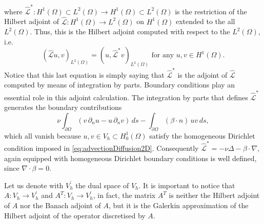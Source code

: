 \documentclass[hidelinks,onefignum,onetabnum]{siamart220329}
\newcommand{\bb}[1]{#1}
\begin{document}
where $\hat{\mathcal{L}}^*:H^1(\Omega)\subset L^2(\Omega) \to H^1(\Omega)\subset L^2(\Omega)$ is the restriction of the Hilbert adjoint of $\hat{\mathcal{L}}:H^1(\Omega)\to L^2(\Omega)$ on $H^1(\Omega)$ extended to the all $L^2(\Omega)$.
Thus, this is the Hilbert adjoint computed with respect to the $L^2(\Omega)$, i.e.
\begin{equation}
    (\hat{\mathcal{L}}u,v)_{L^2(\Omega)} =  (u,\hat{\mathcal{L}}^*v)_{L^2(\Omega)} \text{ for any } u,v\in H^1(\Omega).
\end{equation}
Notice that this last equation is simply saying that $\hat{\mathcal{L}}^*$ is the adjoint of $\hat{\mathcal{L}}$ computed by means of integration by parts.
\bb{Boundary conditions play an essential role in this adjoint calculation. The integration by parts that defines $\hat{\mathcal{L}}^*$ generates the boundary contributions
\begin{equation}
\nu\int_{\partial\Omega}(v\,\partial_n u - u\,\partial_n v)\,ds - \int_{\partial\Omega}(\beta\cdot n)\,u v\,ds,
\end{equation}
which all vanish because $u,v\in V_h\subset H^1_0(\Omega)$ satisfy the homogeneous Dirichlet condition imposed in \eqref{eq:advectionDiffusion2D}. Consequently $\hat{\mathcal{L}}^* = -\nu\Delta - \beta\cdot\nabla$, again equipped with homogeneous Dirichlet boundary conditions is well defined, since $\nabla\cdot\beta = 0$.
}

    {Let us denote with $V_h^\prime$ the dual space of $V_h$}. It is important to notice that $A:V_h\to V_h^\prime$ and $A^T:V_h\to V_h^\prime$, in fact, the matrix $A^T$ is neither the Hilbert adjoint of $A$ nor the Banach adjoint of $A$, but it is the Galerkin approximation of the Hilbert adjoint of the operator discretised by $A$.
\end{document}
